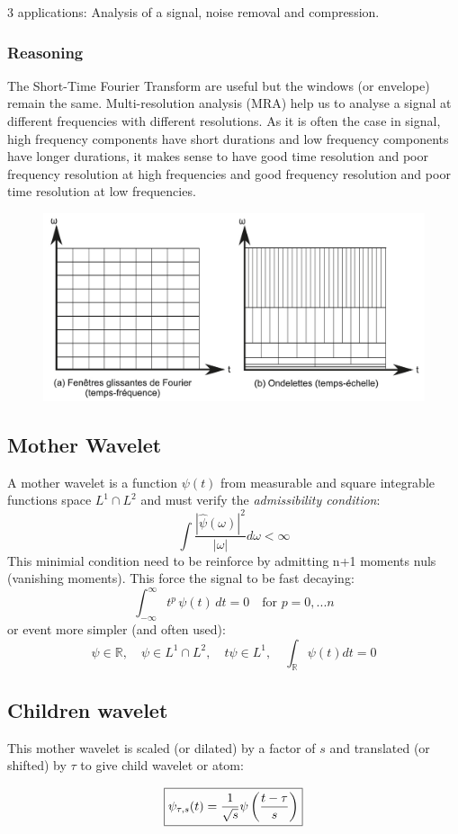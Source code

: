 \documentclass[twocolumn]{article}
\numberwithin{equation}{section}
\begin{document}
3 applications: Analysis of a signal, noise removal and compression. 
			\subsubsection{Reasoning}
The Short-Time Fourier Transform are useful but the windows (or envelope) remain the same. Multi-resolution analysis (MRA) help us to analyse a signal at different frequencies with different resolutions. As it is often the case in signal, high frequency components have short durations and low frequency components have longer durations, it makes sense to have good time resolution and poor frequency resolution at high frequencies and good frequency resolution and poor time resolution at low frequencies.
\begin{figure}[H]
\centering
    \includegraphics[width=.40\textwidth]{500px-STFT_and_WT.jpg}
\end{figure}
		\subsection{Mother Wavelet}
A mother wavelet is a function $\psi (t)$ from measurable and square integrable functions space  $L^1\cap L^2$ and must verify the \textit{admissibility condition}:
$$ \int\frac{|\hat{\psi}(\omega)|^2}{|\omega|}d\omega < \infty$$
This minimial condition need to be reinforce by admitting n+1 moments nuls (vanishing moments). This force the signal to be fast decaying:
$$\int_{-\infty}^{\infty} t^p\,\psi (t)\, dt = 0 \quad \text{for }p=0,...n$$
or event more simpler (and often used):
$$ \psi \in \mathbb{R}, \quad \psi \in L^1\cap L^2, \quad t \psi  \in L^1, \quad  \int_{\mathbb{R}} \psi (t) dt=0$$

		\subsection{Children wavelet}
This mother wavelet is scaled (or dilated) by a factor of $s$ and translated (or shifted) by $\tau$ to give child wavelet or atom:

$$\boxed{\psi _{\tau,s} (t) = {1 \over \sqrt s}\psi \left( {t -\tau \over s} \right)}$$
\end{document}
